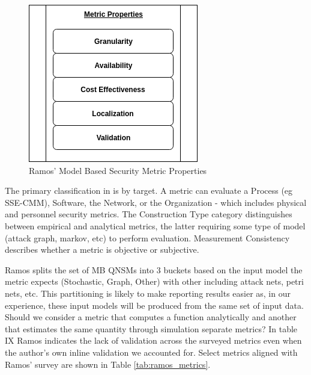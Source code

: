 \begin{figure}[ht]
\centering
\includegraphics[width=.35\linewidth]{resource/img/ch_background/cybok_metrics/ramos_metric_properties.png}
\caption{Ramos’ Model Based Security Metric Properties\cite{Ramos_Lazar_Filho_Rodrigues_2017}}
\label{fig:background:ramos_metric_props}
\end{figure} 

The primary classification in \cite{Ramos_Lazar_Filho_Rodrigues_2017} is by target. A metric can evaluate a Process (eg SSE-CMM), Software, the Network, or the Organization - which includes physical and personnel security metrics. The Construction Type category distinguishes between empirical and analytical metrics, the latter requiring some type of model (attack graph, markov, etc)  to perform evaluation. Measurement Consistency describes whether a metric is objective or subjective. 

Ramos splits the set of MB QNSMs into 3 buckets based on the input model the metric expects (Stochastic, Graph, Other) with other including attack nets, petri nets, etc. This partitioning is likely to make reporting results easier as, in our experience, these input models will be produced from the same set of input data. Should we consider a metric that computes a function analytically and another that estimates the same quantity through simulation separate metrics? In table IX\cite{Ramos_Lazar_Filho_Rodrigues_2017} Ramos indicates the lack of validation across the surveyed metrics even when the author’s own inline validation we accounted for. Select metrics aligned with Ramos' survey are shown in Table \ref{tab:ramos_metrics}.


